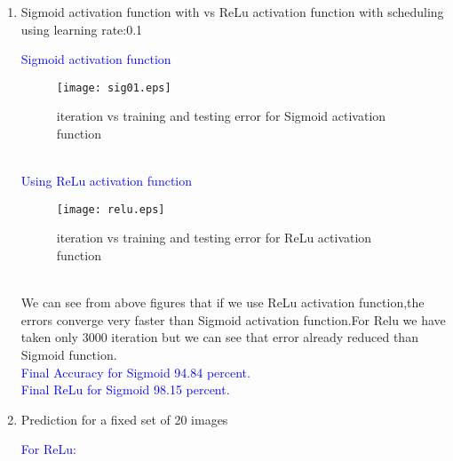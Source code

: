 \documentclass[12pt,a4paper]{article}
\newenvironment{QandA}{\begin{enumerate}[label=\bfseries\alph*.]\bfseries}
                      {\end{enumerate}}
\newenvironment{answered}{\par\normalfont}{}
\begin{document}
\begin{QandA}
\begin{answered}
\begin{figure}[h!]
         \end{figure}\\
         From figures we can clearly see that with Learning rate Scheduling the error converge faster than non scheduling case.
         \end{answered}
         \newpage
         \item Sigmoid activation function with vs ReLu activation function with scheduling using learning rate:0.1 
         \begin{answered}
          \textcolor{blue}{Sigmoid activation function\\}
         \begin{figure}[h!]
	       \begin{center}
		     \texttt{[image: sig01.eps]}
		       \caption{iteration vs training and testing error for Sigmoid activation function}
		       \label{fig:snr20fft}
	       \end{center}
		
         \end{figure}\\
         \textcolor{blue}{Using ReLu activation function\\}
         \begin{figure}[h!]
	       \begin{center}
		     \texttt{[image: relu.eps]}
		       \caption{iteration vs training and testing error for ReLu activation function}
		       \label{fig:snr20fft}
	       \end{center}
		
         \end{figure}\\
         We can see from above figures that if we use  ReLu activation function,the errors converge very faster than Sigmoid activation function.For Relu we have taken only 3000 iteration but we can see that error already reduced than Sigmoid function.\\
              		 \textcolor{blue}{Final Accuracy for Sigmoid 94.84 percent.\\Final ReLu for Sigmoid 98.15 percent.}
         \end{answered}
         \newpage
         \item Prediction for a fixed set of 20 images 
         \begin{answered}
         \textcolor{blue}{For ReLu:}
         


\end{answered}
\end{QandA}
\end{document}
